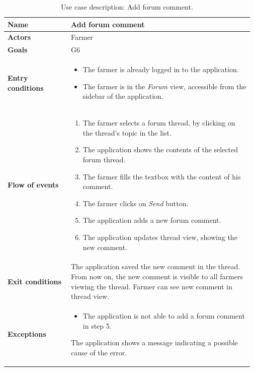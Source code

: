 \begin{table}[H]
    \centering
	\begin{tabular}{@{}p{0.25\linewidth} p{0.72\linewidth}@{}}
\toprule
		\textbf{Name}               & Add forum comment \\
		\midrule
		\textbf{Actors}             & Farmer\\
		\midrule
		\textbf{Goals}              & G6 \\
		\midrule
		
		\textbf{Entry conditions}   & \begin{itemize}[leftmargin=.4cm,noitemsep,topsep=0pt,before=\vspace{-3mm},after=\vspace{-4mm}]
		    \item The farmer is already logged in to the application.
		    \item The farmer is in the \textit{Forum} view, accessible from the sidebar of the application.
		\end{itemize}\\
		\midrule
		
		\textbf{Flow of events}     & \begin{enumerate}[leftmargin=.4cm,noitemsep,topsep=0pt,before=\vspace{-3mm},after=\vspace{-4mm}]
		    \item The farmer selects a forum thread, by clicking on the thread's topic in the list.
		    \item The application shows the contents of the selected forum thread.
		    \item The farmer fills the textbox with the content of his comment.
		    \item The farmer clicks on \textit{Send} button.
		    \item The application adds a new forum comment.
		    \item The application updates thread view, showing the new comment.
		\end{enumerate}\\
		\midrule
		\textbf{Exit conditions} & The application saved the new comment in the thread. From now on, the new comment is visible to all farmers viewing the thread. Farmer can see new comment in thread view. \\
		\midrule
		
		\textbf{Exceptions}         &
	    \begin{itemize}[leftmargin=.4cm,noitemsep,topsep=0pt]
		   \item The application is not able to add a forum comment in step 5. 
		\end{itemize}
		The application shows a message indicating a possible cause of the error.
		\\\bottomrule
	\end{tabular}
	\caption{Use case description: Add forum comment.} 
\end{table}

